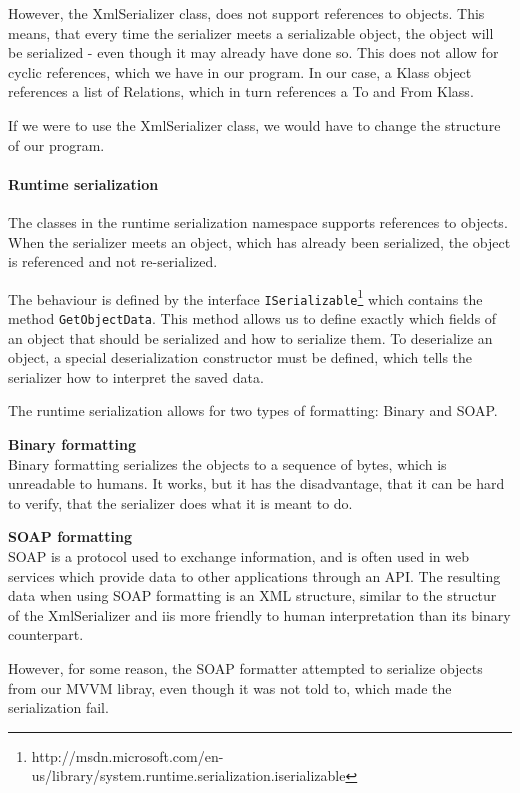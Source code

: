 However, the XmlSerializer class, does not support references to objects. This
means, that every time the serializer meets a serializable object, the object
will be serialized - even though it may already have done so. This does not
allow for cyclic references, which we have in our program. In our case, a Klass
object references a list of Relations, which in turn references a To and From
Klass.

If we were to use the XmlSerializer class, we would have to change the structure
of our program.

\paragraph{Runtime serialization}

The classes in the runtime serialization
namespace supports references to objects. When the serializer meets an object,
which has already been serialized, the object is referenced and not
re-serialized.

The behaviour is defined by the interface 
\texttt{ISerializable}\footnote{http://msdn.microsoft.com/en-us/library/system.runtime.serialization.iserializable}
 which contains the method \texttt{GetObjectData}. This method allows us to 
define exactly which fields of an object that should be serialized and how to 
serialize them. To deserialize an object, a special deserialization constructor 
must be defined, which tells the serializer how to interpret the saved data.

The runtime serialization allows for two types of formatting: Binary and SOAP.

\textbf{Binary formatting}\\
Binary formatting serializes the objects to a
sequence of bytes, which is unreadable to humans. It works, but it has the
disadvantage, that it can be hard to verify, that the serializer does what it is
meant to do.

\textbf{SOAP formatting}\\
SOAP is a protocol used to exchange information, and
is often used in web services which provide data to other applications through
an API. The resulting data when using SOAP formatting is an XML structure,
similar to the structur of the XmlSerializer and iis more friendly to human
interpretation than its binary counterpart.

However, for some reason, the SOAP formatter attempted to serialize objects from
our MVVM libray, even though it was not told to, which made the serialization
fail.

